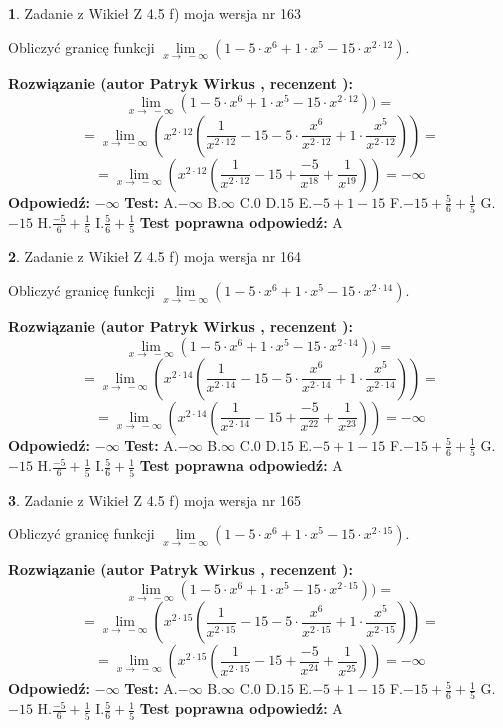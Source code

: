 \documentclass[12pt, a4paper]{article}
\theoremstyle{definition} %
\newtheorem{zad}{}
\newcommand{\zadStart}[1]{\begin{zad}#1\newline}
\newcommand{\zadStop}{\end{zad}}
\newcommand{\rozwStart}[2]{\noindent \textbf{Rozwiązanie (autor #1 , recenzent #2): }\newline}
\newcommand{\rozwStop}{\newline}
\newcommand{\odpStart}{\noindent \textbf{Odpowiedź:}\newline}
\newcommand{\odpStop}{\newline}
\newcommand{\testStart}{\noindent \textbf{Test:}\newline}
\newcommand{\testStop}{\newline}
\newcommand{\kluczStart}{\noindent \textbf{Test poprawna odpowiedź:}\newline}
\newcommand{\kluczStop}{\newline}
\begin{document}
\zadStart{Zadanie z Wikieł Z 4.5 f) moja wersja nr 163}



Obliczyć granicę funkcji  $\lim\limits_{x\to\ -\infty}(1 - 5 \cdot x^{6}+1 \cdot x^{5}- 15 \cdot x^{2\cdot12})$.
\zadStop
\rozwStart{Patryk Wirkus}{}
$$\lim\limits_{x\to\ -\infty}(1 - 5 \cdot x^{6}+1 \cdot x^{5}- 15 \cdot x^{2\cdot12}))=$$
$$=\lim\limits_{x\to\ -\infty}(x^{2\cdot12}(\frac{1}{x^{2\cdot12}}-15 -5 \cdot \frac{x^{6}}{x^{2\cdot12}}+1 \cdot \frac{x^{5}}{x^{2\cdot12}}))=$$
$$=\lim\limits_{x\to\ -\infty}(x^{2\cdot12}(\frac{1}{x^{2\cdot12}}-15 + \frac{-5}{x^{18}}+ \frac{1}{x^{19}}))=-\infty$$
\rozwStop
\odpStart
$-\infty$
\odpStop
\testStart
A.$-\infty$ B.$\infty$ C.$0$ D.$15$ E.$-5 + 1 - 15$
F.$-15+\frac{5}{6}+\frac{1}{5}$ G.$-15$
H.$\frac{-5}{6}+\frac{1}{5}$
I.$\frac{5}{6}+\frac{1}{5}$
\testStop
\kluczStart
A
\kluczStop



\zadStart{Zadanie z Wikieł Z 4.5 f) moja wersja nr 164}



Obliczyć granicę funkcji  $\lim\limits_{x\to\ -\infty}(1 - 5 \cdot x^{6}+1 \cdot x^{5}- 15 \cdot x^{2\cdot14})$.
\zadStop
\rozwStart{Patryk Wirkus}{}
$$\lim\limits_{x\to\ -\infty}(1 - 5 \cdot x^{6}+1 \cdot x^{5}- 15 \cdot x^{2\cdot14}))=$$
$$=\lim\limits_{x\to\ -\infty}(x^{2\cdot14}(\frac{1}{x^{2\cdot14}}-15 -5 \cdot \frac{x^{6}}{x^{2\cdot14}}+1 \cdot \frac{x^{5}}{x^{2\cdot14}}))=$$
$$=\lim\limits_{x\to\ -\infty}(x^{2\cdot14}(\frac{1}{x^{2\cdot14}}-15 + \frac{-5}{x^{22}}+ \frac{1}{x^{23}}))=-\infty$$
\rozwStop
\odpStart
$-\infty$
\odpStop
\testStart
A.$-\infty$ B.$\infty$ C.$0$ D.$15$ E.$-5 + 1 - 15$
F.$-15+\frac{5}{6}+\frac{1}{5}$ G.$-15$
H.$\frac{-5}{6}+\frac{1}{5}$
I.$\frac{5}{6}+\frac{1}{5}$
\testStop
\kluczStart
A
\kluczStop



\zadStart{Zadanie z Wikieł Z 4.5 f) moja wersja nr 165}



Obliczyć granicę funkcji  $\lim\limits_{x\to\ -\infty}(1 - 5 \cdot x^{6}+1 \cdot x^{5}- 15 \cdot x^{2\cdot15})$.
\zadStop
\rozwStart{Patryk Wirkus}{}
$$\lim\limits_{x\to\ -\infty}(1 - 5 \cdot x^{6}+1 \cdot x^{5}- 15 \cdot x^{2\cdot15}))=$$
$$=\lim\limits_{x\to\ -\infty}(x^{2\cdot15}(\frac{1}{x^{2\cdot15}}-15 -5 \cdot \frac{x^{6}}{x^{2\cdot15}}+1 \cdot \frac{x^{5}}{x^{2\cdot15}}))=$$
$$=\lim\limits_{x\to\ -\infty}(x^{2\cdot15}(\frac{1}{x^{2\cdot15}}-15 + \frac{-5}{x^{24}}+ \frac{1}{x^{25}}))=-\infty$$
\rozwStop
\odpStart
$-\infty$
\odpStop
\testStart
A.$-\infty$ B.$\infty$ C.$0$ D.$15$ E.$-5 + 1 - 15$
F.$-15+\frac{5}{6}+\frac{1}{5}$ G.$-15$
H.$\frac{-5}{6}+\frac{1}{5}$
I.$\frac{5}{6}+\frac{1}{5}$
\testStop
\kluczStart
A
\kluczStop
\end{document}
